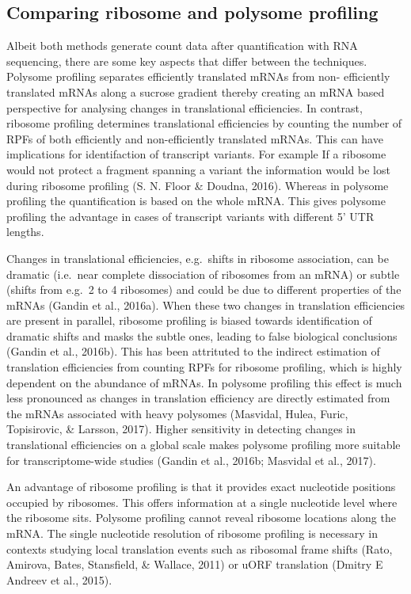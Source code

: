\documentclass[12pt,openany]{book}
\begin{document}
\subsection{Comparing ribosome and polysome profiling}

Albeit both methods generate count data after quantification with RNA
sequencing, there are some key aspects that differ between the
techniques. Polysome profiling separates efficiently translated mRNAs
from non- efficiently translated mRNAs along a sucrose gradient thereby
creating an mRNA based perspective for analysing changes in
translational efficiencies. In contrast, ribosome profiling determines
translational efficiencies by counting the number of RPFs of both
efficiently and non-efficiently translated mRNAs. This can have
implications for identifaction of transcript variants. For example If a
ribosome would not protect a fragment spanning a variant the information
would be lost during ribosome profiling (S. N. Floor \& Doudna, 2016).
Whereas in polysome profiling the quantification is based on the whole
mRNA. This gives polysome profiling the advantage in cases of transcript
variants with different 5' UTR lengths.

Changes in translational efficiencies, e.g.~shifts in ribosome
association, can be dramatic (i.e.~near complete dissociation of
ribosomes from an mRNA) or subtle (shifts from e.g.~2 to 4 ribosomes)
and could be due to different properties of the mRNAs (Gandin et al.,
2016a). When these two changes in translation efficiencies are present
in parallel, ribosome profiling is biased towards identification of
dramatic shifts and masks the subtle ones, leading to false biological
conclusions (Gandin et al., 2016b). This has been attrituted to the
indirect estimation of translation efficiencies from counting RPFs for
ribosome profiling, which is highly dependent on the abundance of mRNAs.
In polysome profiling this effect is much less pronounced as changes in
translation efficiency are directly estimated from the mRNAs associated
with heavy polysomes (Masvidal, Hulea, Furic, Topisirovic, \& Larsson,
2017). Higher sensitivity in detecting changes in translational
efficiencies on a global scale makes polysome profiling more suitable
for transcriptome-wide studies (Gandin et al., 2016b; Masvidal et al.,
2017).

An advantage of ribosome profiling is that it provides exact nucleotide
positions occupied by ribosomes. This offers information at a single
nucleotide level where the ribosome sits. Polysome profiling cannot
reveal ribosome locations along the mRNA. The single nucleotide
resolution of ribosome profiling is necessary in contexts studying local
translation events such as ribosomal frame shifts (Rato, Amirova, Bates,
Stansfield, \& Wallace, 2011) or uORF translation (Dmitry E Andreev et
al., 2015).
\end{document}
